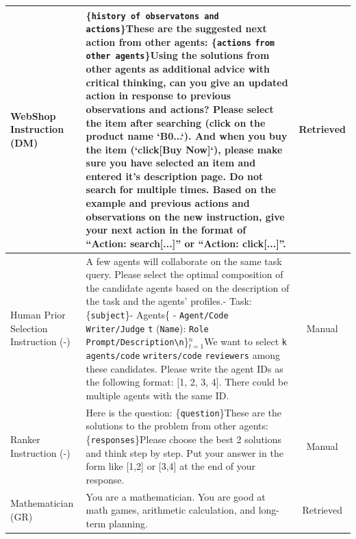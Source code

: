 \documentclass{article} %
\begin{document}
\begin{small}
\begin{longtable}{l|p{6cm}|c}
 WebShop Instruction (DM) & \{\verb|history of observatons and| \verb|actions|\}\newline\newline These are the suggested next action from other agents: \{\verb|actions| \verb|from other agents|\}\newline\newline Using the solutions from other agents as additional advice with critical thinking, can you give an updated action in response to previous observations and actions? Please select the item after searching (click on the product name `B0...`). And when you buy the item (`click[Buy Now]`), please make sure you have selected an item and entered it's description page. Do not search for multiple times. Based on the example and previous actions and observations on the new instruction, give your next action in the format of ``Action: search[...]'' or ``Action: click[...]''. & 
 Retrieved \\\midrule
 Human Prior Selection Instruction (-) & A few agents will collaborate on the same task query. Please select the optimal composition of the candidate agents based on the description of the task and the agents' profiles.\newline\newline- Task: \{\verb|subject|\}\newline- Agents\newline\{  - \verb|Agent/Code Writer/Judge| \verb|t| (\verb|Name|): \verb|Role Prompt/Description\n|\}$_{t=1}^n$\newline\newline We want to select \verb|k| \verb|agents/code| \verb|writers/code| \verb|reviewers| among these candidates. Please write the agent IDs as the following format: [1, 2, 3, 4]. There could be multiple agents with the same ID. & Manual  \\ \midrule
  Ranker Instruction (-) & Here is the question: \{\verb|question|\}\newline\newline These are the solutions to the problem from other agents: \{\verb|responses|\}\newline\newline Please choose the best 2 solutions and think step by step. Put your answer in the form like [1,2] or [3,4] at the end of your response.  & Manual \\ \toprule
 Mathematician (GR) & You are a mathematician. You are good at math games, arithmetic calculation, and long-term planning.  & Retrieved \\ \midrule

\end{longtable}
\end{small}
\end{document}

